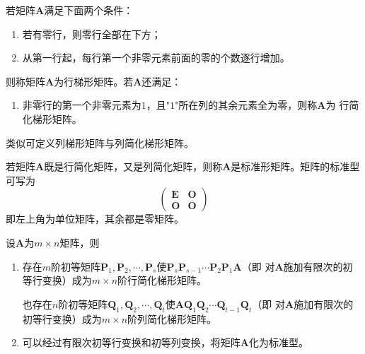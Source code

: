 \begin{definition}[梯形矩阵]
    若矩阵$\boldsymbol{A}$满足下面两个条件：
    \begin{enumerate}[(1)]
        \item 若有零行，则零行全部在下方；
        \item 从第一行起，每行第一个非零元素前面的零的个数逐行增加。
    \end{enumerate}
    则称矩阵$\boldsymbol{A}$为{\heiti 行梯形矩阵}。若$\boldsymbol{A}$还满足：
    \begin{enumerate}[(3)]
        \item 非零行的第一个非零元素为$1$，且"$1$"所在列的其余元素全为零，则称$\boldsymbol{A}$为
        {\heiti 行简化梯形矩阵}。
    \end{enumerate}

    类似可定义{\heiti 列梯形矩阵}与{\heiti 列简化梯形矩阵}。
\end{definition}

\begin{theorem}[矩阵的标准型]
    若矩阵$\boldsymbol{A}$既是行简化矩阵，又是列简化矩阵，则称$\boldsymbol{A}$是{\heiti 标准形矩阵}。矩阵的标准型可写为
    $$\left(\begin{array}{cc}
        \boldsymbol{E} & \boldsymbol{O}\\
        \boldsymbol{O} & \boldsymbol{O}
    \end{array}\right)$$
    即左上角为单位矩阵，其余都是零矩阵。
\end{theorem}

\begin{theorem}[矩阵的化简]
    设$\boldsymbol{A}$为$m\times n$矩阵，则
    \begin{enumerate}[(1)]
        \item 存在$m$阶初等矩阵$\boldsymbol{P}_1,\boldsymbol{P}_2,\cdots,\boldsymbol{P}_s$使$\boldsymbol{P}_s\boldsymbol{P}_{s-1}\cdots\boldsymbol{P}_2\boldsymbol{P}_1\boldsymbol{A}$（即
        对$\boldsymbol{A}$施加有限次的初等行变换）成为$m\times n$阶行简化梯形矩阵。

        也存在$n$阶初等矩阵$\boldsymbol{Q}_1,\boldsymbol{Q}_2,\cdots,\boldsymbol{Q}_t$使$\boldsymbol{A}\boldsymbol{Q}_1\boldsymbol{Q}_2\cdots\boldsymbol{Q}_{t-1}\boldsymbol{Q}_t$（即
        对$\boldsymbol{A}$施加有限次的初等行变换）成为$m\times n$阶列简化梯形矩阵。
        \item 可以经过有限次初等行变换和初等列变换，将矩阵$\boldsymbol{A}$化为标准型。
    \end{enumerate}
\end{theorem}

